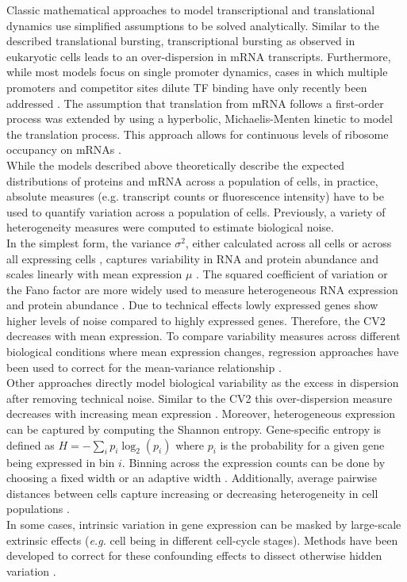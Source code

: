 Classic mathematical approaches to model transcriptional and translational dynamics use simplified assumptions to be solved analytically. Similar to the described translational bursting, transcriptional bursting as observed in eukaryotic cells \citep{Raj2006} leads to an over-dispersion in mRNA transcripts. Furthermore, while most models focus on single promoter dynamics, cases in which multiple promoters and competitor sites dilute TF binding have only recently been addressed \citep{Das2015a}. The assumption that translation from mRNA follows a first-order process was extended by using a hyperbolic, Michaelis-Menten kinetic to model the translation process. This approach allows for continuous levels of ribosome occupancy on mRNAs \citep{VanDyken2017}. \\ 

While the models described above theoretically describe the expected distributions of proteins and mRNA across a population of cells, in practice, absolute measures (e.g. transcript counts or fluorescence intensity) have to be used to quantify variation across a population of cells. Previously, a variety of heterogeneity measures were computed to estimate biological noise. \\

In the simplest form, the variance $\sigma^2$, either calculated across all cells or across all expressing cells \citep{Shalek2014}, captures variability in RNA and protein abundance and scales linearly with mean expression $\mu$ \citep{Dey2015a}. The squared coefficient of variation or the Fano factor are more widely used to measure heterogeneous RNA expression \citep{Brennecke2013, Jones2014} and protein abundance \citep{Newman2006}. Due to technical effects \citep{Brennecke2013} lowly expressed genes show higher levels of noise compared to highly expressed genes. Therefore, the CV2 decreases with mean expression. To compare variability measures across different biological conditions where mean expression changes, regression approaches have been used to correct for the mean-variance relationship \citep{Kolodziejczyk2015cell, Fan2016}. \\
 
Other approaches directly model biological variability as the excess in dispersion after removing technical noise. Similar to the CV2 this over-dispersion measure decreases with increasing mean expression \citep{Vallejos2015BASiCS}. Moreover, heterogeneous expression can be captured by computing the Shannon entropy. Gene-specific entropy is defined as $H=-\sum_i{}p_i\log_2(p_i)$ where $p_i$ is the probability for a given gene being expressed in bin $i$. Binning across the expression counts can be done by choosing a fixed width \citep{Richard2016} or an adaptive width \citep{Stumpf2017}. Additionally, average pairwise distances between cells capture increasing or decreasing heterogeneity in cell populations \citep{Mohammed2017}. \\ 

In some cases, intrinsic variation in gene expression can be masked by large-scale extrinsic effects (\emph{e.g.} cell being in different cell-cycle stages). Methods have been developed to correct for these confounding effects to dissect otherwise hidden variation \citep{Buettner2015, Buettner2017}.
